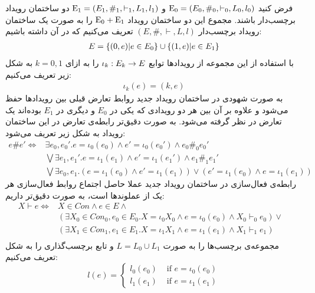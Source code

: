 \begin{definition}
    فرض کنید
    $\mathrm{E}_0 = (E_0,\#_0,\vdash_0,L_0,l_0)$
    و
    $\mathrm{E}_1 = (E_1,\#_1,\vdash_1,L_1,l_1)$
    دو ساختمان رویداد برچسب‌دار باشند.
    مجموع این دو ساختمان رویداد
    $\mathrm{E}_0 + \mathrm{E}_1$
    را به صورت یک ساختمان رویداد برچسب‌دار
    $(E,\#,\vdash,L,l)$
    تعریف می‌کنیم که در آن داشته باشیم:
    \begin{align*}
        E = \{(0,e)|e \in E_0\} \cup \{(1,e)|e \in E_1\}
    \end{align*}
    با استفاده از این مجموعه از رویداد‌ها توابع
    $\iota_k: E_k \rightarrow E$
    را به ازای
    $k=0,1$
    به شکل زیر تعریف می‌کنیم:
    \begin{align*}
        \iota_k(e) = (k,e)
    \end{align*}
    به صورت شهودی در ساختمان رویداد جدید روابط تعارض قبلی بین رویداد‌ها حفظ می‌شود و علاوه بر آن
    بین هر دو رویدادی که یکی در
    $E_0$
    و دیگری در
    $E_1$
    بوده‌‌اند یک تعارض در نظر گرفته می‌شود.
    به صورت دقیق‌تر رابطه‌ی تعارض در این ساختمان رویداد به شکل زیر تعریف می‌شود:
    \begin{align*}
        e \# e' \iff & \exists e_0,e_0'. e = \iota_0(e_0)
        \wedge e' = \iota_0(e_0') \wedge e_0 \#_0e_0'             \\
                     & \bigvee \exists e_1,e_1'. e = \iota_1(e_1)
        \wedge e' = \iota_1(e_1') \wedge e_1 \#_1 e_1'            \\
                     & \bigvee \exists e_0,e_1.(e=\iota_1(e_0)
        \wedge e' =\iota_1(e_1)) \vee
        (e'=\iota_1(e_0) \wedge e =\iota_1(e_1))
    \end{align*}
    رابطه‌ی فعال‌سازی در ساختمان رویداد جدید عملا حاصل اجتماع روابط فعال‌سازی هر یک از عملوند‌ها است، به صورت دقیق‌تر داریم:
    \begin{align*}
        X \vdash e \iff & X \in Con \wedge e \in E \wedge                   & \\
                        & (\exists X_0 \in Con_0,e_0 \in E_0.X = \iota_0X_0
        \wedge e = \iota_0(e_0) \wedge X_0 \vdash_0 e_0) \vee                 \\
                        & (\exists X_1 \in Con_1,e_1 \in E_1.X = \iota_1X_1
        \wedge e = \iota_1(e_1) \wedge X_1 \vdash_1 e_1)                      \\
    \end{align*}
    مجموعه‌ی برچسب‌ها را به صورت
    $L = L_0 \cup L_1$
    و تابع برچسب‌گذاری را به شکل تعریف می‌کنیم:
    $$
        l(e) = \begin{cases}
            l_0(e_0) & \text{ if } e = \iota_0(e_0) \\
            l_1(e_1) & \text{ if } e = \iota_1(e_1)
        \end{cases}
    $$
\end{definition}

